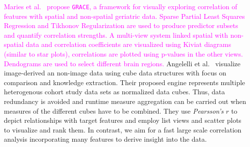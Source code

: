 \documentclass[journal]{style/vgtc} 			          %
\newcommand{\magenta}[1]{\textcolor{magenta}{#1}}
\begin{document}
\magenta{
Maries et al.~\cite{GRACE} propose \texttt{GRACE}, a framework for visually exploring correlation of features with spatial and non-spatial geriatric data.
Sparse Partial Least Squares Regression and Tikhonov Regularization are used to produce predictor subsets and quantify correlation strengths.
A multi-view system linked spatial with non-spatial data and correlation coefficients are visualized using Kiviat diagrams (similar to star plots), correlations are plotted using p-values in the other views.
Dendograms are used to select different brain regions. 
}
Angelelli et al.~\cite{Angelelli} visualize image-derived an non-image data using cube data structures with focus on comparison and knowledge extraction.
Their proposed engine represents multiple heterogenous cohort study data sets as normalized data cubes.
Thus, data redundancy is avoided and runtime measure aggregation can be carried out when measures of the different cubes have to be combined.
They use \emph{Pearsson's} $r$ to depict relationships with target features and employ list views and scatter plots to visualize and rank them.
In contrast, we aim for a fast large scale correlation analysis incorporating many features to derive insight into the data.
\end{document}
